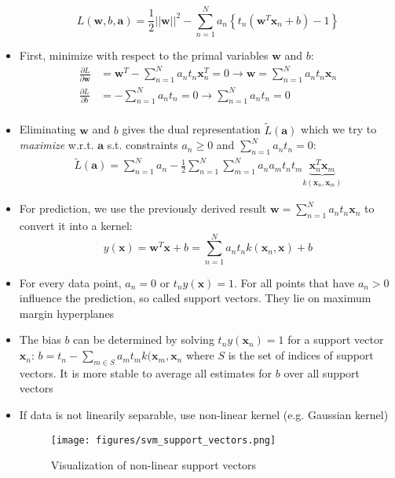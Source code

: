 \begin{itemize}
	$$L\left(\bm{w},b,\bm{a}\right) = \frac{1}{2}||\bm{w}||^2 - \sum\limits_{n=1}^{N} a_n \left\{t_n \left(\bm{w}^T \bm{x}_n + b\right) - 1\right\}$$
	\item First, minimize with respect to the primal variables $\bm{w}$ and $b$:
	\begin{equation*}
		\begin{split}
			\frac{\partial L}{\partial \bm{w}} & = \bm{w}^T - \sum\limits_{n=1}^{N} a_n t_n \bm{x}_n^T = 0\to \bm{w} = \sum\limits_{n=1}^{N}a_n t_n \bm{x}_n\\
			\frac{\partial L}{\partial b} & = - \sum\limits_{n=1}^{N} a_n t_n = 0\to \sum\limits_{n=1}^{N} a_n t_n = 0\\
		\end{split}
	\end{equation*}
	\item Eliminating $\bm{w}$ and $b$ gives the dual representation $\tilde{L}(\bm{a})$ which we try to \textit{maximize} w.r.t. $\bm{a}$ s.t. constraints $a_n \geq 0$ and $\sum_{n=1}^{N} a_n t_n = 0$:
	\begin{equation*}
		\begin{split}
			\tilde{L}(\bm{a}) = \sum\limits_{n=1}^{N} a_n - \frac{1}{2} \sum\limits_{n=1}^{N}\sum\limits_{m=1}^{N} a_n a_m t_n t_m \underbrace{\bm{x}_n^T \bm{x}_m}_{k(\bm{x}_n, \bm{x}_m)}
		\end{split}
	\end{equation*}
	\item For prediction, we use the previously derived result $\bm{w} = \sum_{n=1}^{N}a_n t_n \bm{x}_n$ to convert it into a kernel:
	$$y(\bm{x})=\bm{w}^T \bm{x} + b = \sum_{n=1}^{N}a_n t_n k(\bm{x}_n, \bm{x}) +b$$
	\item For every data point, $a_n = 0$ or $t_n y(\bm{x}) = 1$. For all points that have $a_n > 0$ influence the prediction, so called support vectors. They lie on maximum margin hyperplanes 
	\item The bias $b$ can be determined by solving $t_n y(\bm{x}_n) = 1$ for a support vector $\bm{x}_n$: $b = t_n - \sum_{m \in S} a_m t_m k(\bm{x}_m,\bm{x}_n$ where $S$ is the set of indices of support vectors. It is more stable to average all estimates for $b$ over all support vectors
	\item If data is not linearily separable, use non-linear kernel (e.g. Gaussian kernel)
	\begin{figure}[ht]
		\centering
		\texttt{[image: figures/svm\_support\_vectors.png]}
		\caption{Visualization of non-linear support vectors}
		\label{img:svm_support_vectors}
	\end{figure}
\end{itemize}
